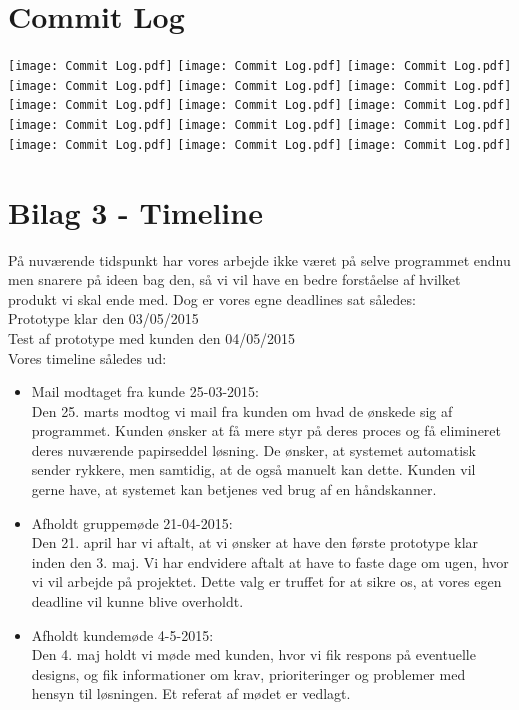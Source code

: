 \documentclass[a4paper]{article}
\begin{document}
\section{Commit Log}
\texttt{[image: Commit Log.pdf]}
\newpage
\texttt{[image: Commit Log.pdf]}
\newpage
\texttt{[image: Commit Log.pdf]}
\newpage
\texttt{[image: Commit Log.pdf]}
\newpage
\texttt{[image: Commit Log.pdf]}
\newpage
\texttt{[image: Commit Log.pdf]}
\newpage
\texttt{[image: Commit Log.pdf]}
\newpage
\texttt{[image: Commit Log.pdf]}
\newpage
\texttt{[image: Commit Log.pdf]}
\newpage
\texttt{[image: Commit Log.pdf]}
\newpage
\texttt{[image: Commit Log.pdf]}
\newpage
\texttt{[image: Commit Log.pdf]}
\newpage
\texttt{[image: Commit Log.pdf]}
\newpage
\texttt{[image: Commit Log.pdf]}
\newpage
\texttt{[image: Commit Log.pdf]}
\newpage
\section{Bilag 3 - Timeline}
På nuværende tidspunkt har vores arbejde ikke været på selve programmet endnu men snarere på ideen bag den, så vi vil have en bedre forståelse af hvilket produkt vi skal ende med. Dog er vores egne deadlines sat således:\\
Prototype klar den 03/05/2015 \\
Test af prototype med kunden den 04/05/2015\\
Vores timeline således ud:
\begin{itemize}
	\item Mail modtaget fra kunde 25-03-2015:\\
Den 25. marts modtog vi mail fra kunden om hvad de ønskede sig af programmet. Kunden ønsker at få mere styr på deres proces og få elimineret deres nuværende papirseddel løsning. De ønsker, at systemet automatisk sender rykkere, men samtidig, at de også manuelt kan dette. Kunden vil gerne have, at systemet kan betjenes ved brug af en håndskanner.
	\item Afholdt gruppemøde 21-04-2015:\\
Den 21. april har vi aftalt, at vi ønsker at have den første prototype klar inden den 3. maj. Vi har endvidere aftalt at have to faste dage om ugen, hvor vi vil arbejde på projektet. Dette valg er truffet for at sikre os, at vores egen deadline vil kunne blive overholdt.
	\item Afholdt kundemøde 4-5-2015:\\
Den 4. maj holdt vi møde med kunden, hvor vi fik respons på eventuelle designs, og fik informationer om krav, prioriteringer og problemer med hensyn til løsningen. Et referat af mødet er vedlagt.
\end{itemize}
\pagebreak
\end{document}
